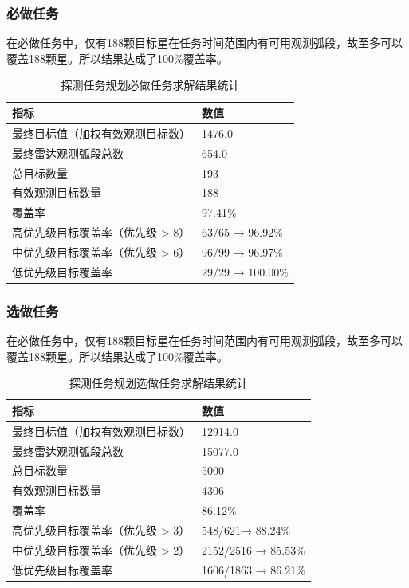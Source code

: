 \documentclass[openany,12pt,UTF8]{ctexart}
\begin{document}
\subsubsection{必做任务}
在必做任务中，仅有188颗目标星在任务时间范围内有可用观测弧段，故至多可以覆盖188颗星。所以结果达成了100\%覆盖率。
\begin{table}[h]
    \centering
    \caption{探测任务规划必做任务求解结果统计}
    \label{tab:探测任务规划必做任务求解结果统计}
    \begin{tabularx}{0.8\columnwidth}{Xl}
        \toprule
        \textbf{指标}        & \textbf{数值}      \\
        \midrule
        最终目标值（加权有效观测目标数）   & 1476.0           \\
        最终雷达观测弧段总数         & 654.0            \\
        总目标数量              & 193              \\
        有效观测目标数量           & 188              \\
        覆盖率                & 97.41\%          \\
        高优先级目标覆盖率（优先级 > 8） & 63/65 → 96.92\%  \\
        中优先级目标覆盖率（优先级 > 6） & 96/99 → 96.97\%  \\
        低优先级目标覆盖率          & 29/29 → 100.00\% \\
        \bottomrule
    \end{tabularx}
\end{table}

\subsubsection{选做任务}
在必做任务中，仅有188颗目标星在任务时间范围内有可用观测弧段，故至多可以覆盖188颗星。所以结果达成了100\%覆盖率。
\begin{table}[h]
    \centering
    \caption{探测任务规划选做任务求解结果统计}
    \label{tab:探测任务规划选做任务求解结果统计}
    \begin{tabularx}{0.8\columnwidth}{Xl}
        \toprule
        \textbf{指标}        & \textbf{数值}      \\
        \midrule
        最终目标值（加权有效观测目标数）   & 12914.0           \\
        最终雷达观测弧段总数         & 15077.0            \\
        总目标数量              & 5000              \\
        有效观测目标数量           & 4306              \\
        覆盖率                & 86.12\%          \\
        高优先级目标覆盖率（优先级 > 3） & 548/621→ 88.24\%  \\
        中优先级目标覆盖率（优先级 > 2） & 2152/2516 → 85.53\%  \\
        低优先级目标覆盖率          & 1606/1863 → 86.21\% \\
        \bottomrule
    \end{tabularx}
\end{table}
\end{document}
